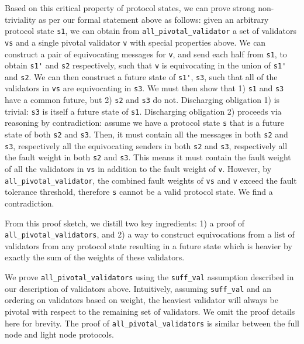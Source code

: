 \documentclass[runningheads]{llncs}
\begin{document}
Based on this critical property of protocol states, we can prove strong non-triviality as per our formal statement above as follows: given an arbitrary protocol state \verb|s1|, we can obtain from \verb|all_pivotal_validator| a set of validators \verb|vs| and a single pivotal validator \verb|v| with special properties above. We can construct a pair of equivocating messages for \verb|v|, and send each half from \verb|s1|, to obtain \verb|s1'| and \verb|s2| respectively, such that \verb|v| is equivocating in the union of \verb|s1'| and \verb|s2|. We can then construct a future state of \verb|s1'|, \verb|s3|, such that all of the validators in \verb|vs| are equivocating in \verb|s3|. We must then show that 1) \verb|s1| and \verb|s3| have a common future, but 2) \verb|s2| and \verb|s3| do not. Discharging obligation 1) is trivial: \verb|s3| is itself a future state of \verb|s1|. Discharging obligation 2) proceeds via reasoning by contradiction: assume we have a protocol state \verb|s| that is a future state of both \verb|s2| and \verb|s3|. Then, it must contain all the messages in both \verb|s2| and \verb|s3|, respectively all the equivocating senders in both \verb|s2| and \verb|s3|, respectively all the fault weight in both \verb|s2| and \verb|s3|. This means it must contain the fault weight of all the validators in \verb|vs| in addition to the fault weight of \verb|v|. However, by \verb|all_pivotal_validator|, the combined fault weights of \verb|vs| and \verb|v| exceed the fault tolerance threshold, therefore \verb|s| cannot be a valid protocol state. We find a contradiction. 

From this proof sketch, we distill two key ingredients: 1) a proof of \verb|all_pivotal_validators|, and 2) a way to construct equivocations from a list of validators from any protocol state resulting in a future state which is heavier by exactly the sum of the weights of these validators. 

We prove \verb|all_pivotal_validators| using the \verb|suff_val| assumption described in our description of validators above. Intuitively, assuming \verb|suff_val| and an ordering on validators based on weight, the heaviest validator will always be pivotal with respect to the remaining set of validators. We omit the proof details here for brevity. The proof of \verb|all_pivotal_validators| is similar between the full node and light node protocols. 
\end{document}
